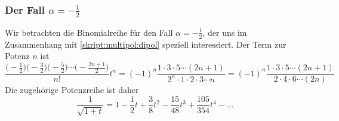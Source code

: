 \subsubsection{Der Fall $\alpha=-\frac12$}
Wir betrachten die Binomialreihe für den Fall $\alpha=-\frac12$, der
uns im Zusammenhang mit \eqref{skript:multipol:dipol} speziell
interessiert.
Der Term zur Potenz $n$ ist
\begin{equation}
\frac{
\bigl(-\frac12\bigr)
\bigl(-\frac32\bigr)
\bigl(-\frac52\bigr)
\cdots
\bigl(-\frac{2n+1}2\bigr)}{n!} t^n
=
(-1)^n \frac{1\cdot 3\cdot 5 \cdots (2n + 1)}{2^n\cdot 1\cdot 2\cdot 3\cdots n}
=
(-1)^n \frac{1\cdot 3\cdot 5 \cdots (2n+1)}{2\cdot 4\cdot 6\cdots (2n)}
\label{skript:multipol:koeffizienten}
\end{equation}
Die zugehörige Potenzreihe ist daher
\[
\frac1{\sqrt{1+t}}
=
1-\frac12t+\frac3{8}t^2-\frac{15}{48}t^3+\frac{105}{354}t^4-\dots
\]

